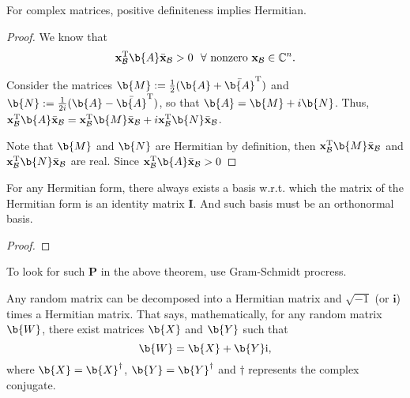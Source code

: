 \begin{remark}
For complex matrices, positive definiteness implies Hermitian.
\end{remark}
%
\begin{proof}
We know that
$$ \x_{\mathcal{B}}^\T \b{A} \bar{\x}_{\mathcal{B}} > 0  ~\ \forall \textnormal{ nonzero } \x_{\mathcal{B}} \in \C^n .$$

Consider the matrices 
$\b{M}:=\frac{1}{2}(\b{A} + \bar{\b{A}}^\T)$
and 
$ \b{N}:=\frac{1}{2i}(\b{A} - \bar{\b{A}}^\T)$, 
so that $\b{A} = \b{M} + i\b{N}$. 
Thus, $\x_{\mathcal{B}}^\T \b{A} \bar{\x}_{\mathcal{B}} = \x_{\mathcal{B}}^\T \b{M} \bar{\x}_{\mathcal{B}} + i \x_{\mathcal{B}}^\T \b{N} \bar{\x}_{\mathcal{B}}$.

Note that $\b{M}$ and $\b{N}$ are Hermitian by definition, then  $\x_{\mathcal{B}}^\T \b{M} \bar{\x}_{\mathcal{B}}$ and $\x_{\mathcal{B}}^\T \b{N} \bar{\x}_{\mathcal{B}}$ are real.
Since $\x_{\mathcal{B}}^\T \b{A} \bar{\x}_{\mathcal{B}} > 0$

\end{proof}

\begin{theorem}
\label{thm:matrix_of_HF_is_identity}
For any Hermitian form, there always exists a basis w.r.t. which the matrix of the Hermitian form is an identity matrix $\bm I$.
And such basis must be an orthonormal basis.
\end{theorem}

\begin{proof}

\end{proof}


\begin{remark}
To look for such $\bm P$ in the above theorem, use Gram-Schmidt procress. 
\end{remark}



\begin{theorem} \label{hermitian_decomposition}
Any random matrix can be decomposed into a Hermitian matrix and $\sqrt{-1}$ (or $\mathbf{i}$) times a Hermitian matrix. 
That says, mathematically, for any random matrix $\b{W}$, there exist matrices $\b{X}$ and $\b{Y}$ such that
%
\begin{equation*}
    \b{W} = \b{X} + \b{Y} \mathrm{i} ,
\end{equation*}
%
where $\b{X} = \b{X}^\dagger$, $\b{Y} = \b{Y}^\dagger$ and $\dagger$ represents the complex conjugate.
\end{theorem}

